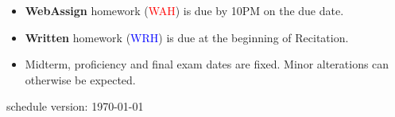 \documentclass[12pt]{article}
\begin{document}
\begin{itemize}
\item \textbf{WebAssign} homework (\textcolor{red}{WAH}) is due by 10PM on the due date. 
\item \textbf{Written} homework (\textcolor{blue}{WRH}) is due at the beginning of Recitation.
\item Midterm, proficiency and final exam dates are fixed. Minor
alterations can otherwise be expected.
\end{itemize}



\vfill
\hfill \scriptsize schedule version: \today \normalsize
\end{document}
